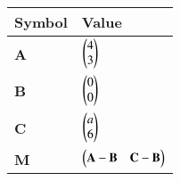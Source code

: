
\begin{tabular}{|m{5em} |m{10em}|}
\hline
\textbf{Symbol} & \textbf{Value}  \\
\hline 
\textbf{A} & $\begin{pmatrix}4\\3\end{pmatrix}$  \\
\hline 
\textbf{B} & $\begin{pmatrix}0\\0\end{pmatrix}$  \\
\hline
\textbf{C} & $\begin{pmatrix}a\\6\end{pmatrix}$  \\
\hline
\textbf{M} & $\begin{pmatrix}\textbf{A} - \textbf{B} & \textbf{C} - \textbf{B}\end{pmatrix}$  \\
\hline
\end{tabular}

